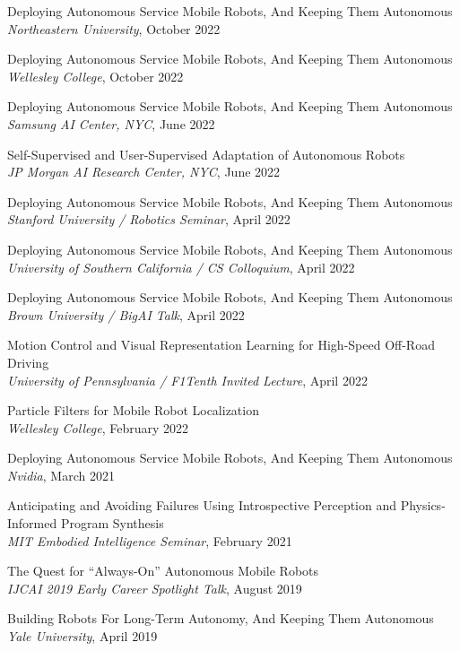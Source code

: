 \documentclass[Times]{article}
\begin{document}
Deploying Autonomous Service Mobile Robots, And Keeping Them Autonomous
\\
{\em Northeastern University}, October 2022

Deploying Autonomous Service Mobile Robots, And Keeping Them Autonomous
\\
{\em Wellesley College}, October 2022

Deploying Autonomous Service Mobile Robots, And Keeping Them Autonomous
\\
{\em Samsung AI Center, NYC}, June 2022

Self-Supervised and User-Supervised Adaptation of Autonomous Robots
\\
{\em JP Morgan AI Research Center, NYC}, June 2022

Deploying Autonomous Service Mobile Robots, And Keeping Them Autonomous
\\
{\em Stanford University / Robotics Seminar}, April 2022

Deploying Autonomous Service Mobile Robots, And Keeping Them Autonomous
\\
{\em University of Southern California / CS Colloquium}, April 2022

Deploying Autonomous Service Mobile Robots, And Keeping Them Autonomous
\\
{\em Brown University / BigAI Talk}, April 2022

Motion Control and Visual Representation Learning for High-Speed Off-Road Driving
\\
{\em University of Pennsylvania / F1Tenth Invited Lecture}, April 2022

Particle Filters for Mobile Robot Localization
\\
{\em Wellesley College}, February 2022

Deploying Autonomous Service Mobile Robots, And Keeping Them Autonomous
\\
{\em Nvidia}, March 2021

Anticipating and Avoiding Failures Using Introspective Perception and Physics-Informed Program Synthesis\\
{\em MIT Embodied Intelligence Seminar}, February 2021

The Quest for ``Always-On'' Autonomous Mobile Robots\\
{\em IJCAI 2019 Early Career Spotlight Talk}, August 2019

Building Robots For Long-Term Autonomy, And Keeping Them Autonomous\\
{\em Yale University}, April 2019
\end{document}
